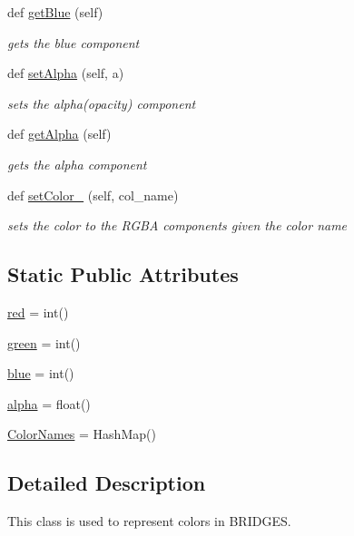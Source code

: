 \begin{DoxyCompactItemize}
def \hyperlink{class_color_1_1_color_a00ee33a98b9243f68dd02d4882698ff6}{get\+Blue} (self)
\begin{DoxyCompactList}\small\item\em gets the blue component \end{DoxyCompactList}\item 
def \hyperlink{class_color_1_1_color_a794d9889de916d2d45f29437547feddd}{set\+Alpha} (self, a)
\begin{DoxyCompactList}\small\item\em sets the alpha(opacity) component \end{DoxyCompactList}\item 
def \hyperlink{class_color_1_1_color_a2d8eedef0a8731d96e2a1f802d04b42e}{get\+Alpha} (self)
\begin{DoxyCompactList}\small\item\em gets the alpha component \end{DoxyCompactList}\item 
def \hyperlink{class_color_1_1_color_ab17d74d2318751b06e1fc9688f7ee273}{set\+Color\+\_} (self, col\+\_\+name)
\begin{DoxyCompactList}\small\item\em sets the color to the R\+G\+BA components given the color name \end{DoxyCompactList}\end{DoxyCompactItemize}
\subsection*{Static Public Attributes}
\begin{DoxyCompactItemize}
\item 
\hyperlink{class_color_1_1_color_ad6b9578f975c4f066a1e34dff6ac557a}{red} = int()
\item 
\hyperlink{class_color_1_1_color_a608f39a75b991c1ffda8bd91d9744d2b}{green} = int()
\item 
\hyperlink{class_color_1_1_color_aae0c5d7ff0540d207fac048534b7e8bf}{blue} = int()
\item 
\hyperlink{class_color_1_1_color_a27e8f74882075cc184a9bbc2da65f8a3}{alpha} = float()
\item 
\hyperlink{class_color_1_1_color_ade3e7466d27087359ca123a8406c6f3f}{Color\+Names} = Hash\+Map()
\end{DoxyCompactItemize}


\subsection{Detailed Description}
This class is used to represent colors in B\+R\+I\+D\+G\+ES. 


